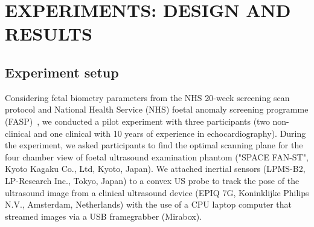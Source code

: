 \documentclass[a4paper, 10pt, conference]{ieeeconf}      %
\begin{document}

\section{EXPERIMENTS: DESIGN AND RESULTS}
\subsection{Experiment setup}
Considering fetal biometry parameters from the NHS 20-week screening scan protocol and National Health Service (NHS) foetal anomaly screening programme (FASP)~\cite{NHS_england2022},
we conducted a pilot experiment with three participants (two non-clinical and one clinical with 10 years of experience in echocardiography).
During the experiment, we asked participants to find the optimal scanning plane for the four chamber view of foetal ultrasound examination phantom ("SPACE FAN-ST", Kyoto Kagaku Co., Ltd, Kyoto, Japan).
We attached inertial sensors (LPMS-B2, LP-Research Inc., Tokyo, Japan) to a convex US probe to track the pose of the ultrasound image from a clinical ultrasound device (EPIQ 7G, Koninklijke Philips N.V., Amsterdam, Netherlands) with the use of a CPU laptop computer that streamed images via a USB framegrabber (Mirabox).
\end{document}
